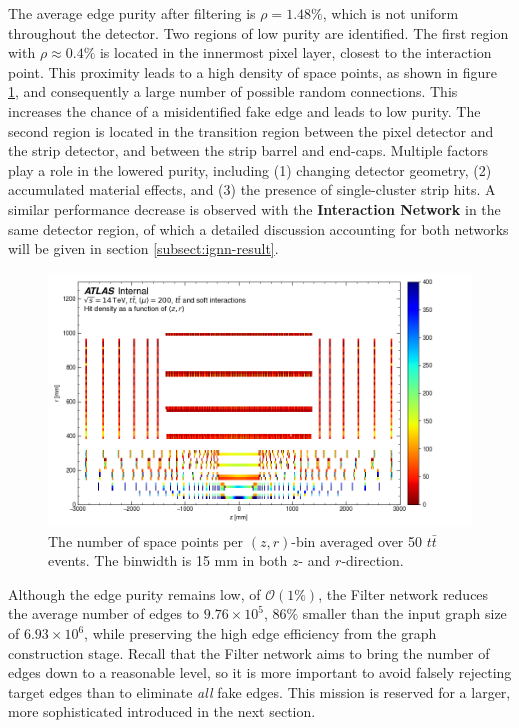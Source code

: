 The average edge purity after filtering is $\rho=1.48\%$, which is not uniform throughout the detector. 
Two regions of low purity are identified. 
The first region with ${\rho}\approx0.4\%$ is located in the innermost pixel layer, closest to the interaction point. 
This proximity leads to a high density of space points, as shown in figure \ref{fig:hit-density-rz}, and consequently a large number of possible random connections. 
This increases the chance of a misidentified fake edge and leads to low purity.
The second region is located in the transition region between the pixel detector and the strip detector, and between the strip barrel and end-caps. 
Multiple factors play a role in the lowered purity, including (1) changing detector geometry, (2) accumulated material effects, and (3) the presence of single-cluster strip hits. 
A similar performance decrease is observed with the \textbf{Interaction Network} in the same detector region, of which a detailed discussion accounting for both networks will be given in section \ref{subsect:ignn-result}.  

\begin{figure}[h!]
    \centering
    \includegraphics[width=\textwidth, trim={0cm 0 2cm 0}, clip]{figures/hit-density.png}
    \caption{The number of space points per $(z,r)$-bin averaged over 50 $t\bar{t}$ events. The binwidth is 15 mm in both $z$- and $r$-direction.}
    \label{fig:hit-density-rz}
\end{figure}

Although the edge purity remains low, of $\mathcal{O}(1\%)$, the Filter network reduces the average number of edges to $9.76\times 10^5$, $86\%$ smaller than the input graph size of $6.93\times 10^6$, while preserving the high edge efficiency from the graph construction stage.
Recall that the Filter network aims to bring the number of edges down to a reasonable level, so it is more important to avoid falsely rejecting target edges than to eliminate \textit{all} fake edges. 
This mission is reserved for a larger, more sophisticated \ignn introduced in the next section.

